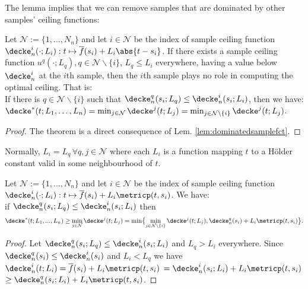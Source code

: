 The lemma implies that we can remove samples that are dominated by other samples' ceiling functions:
\begin{thm} 
\label{thm:removedominatedsamples}
Let $\mathcal N := \{1,...,N_n\}$ and let $i \in \mathcal N$ be the index of sample ceiling function $\decke_n^i(\cdot;L_i): t \mapsto \overline f(s_i) + L_i \abs{t - s_i}$. If there exists a sample ceiling function $u^q(\cdot;L_q), q \in \mathcal N \backslash \{i\}$, $L_q \leq L_i$ everywhere, having a value below $\decke_n^i$ at the $i$th sample, then the $i$th sample plays no role in computing the optimal ceiling. That is:\\  
If there is $q \in \mathcal N \backslash\{ i\}$ such that $\decke_n^q(s_i;L_q) \leq \decke_n^i(s_i;L_i)$, then we have: \\
$\decke^*(t;L_1,\ldots,L_n) = \min_{j \in \mathcal N} \decke^j(t;L_j) =  \min_{j \in \mathcal N\backslash \{i\}} \decke^j(t;L_j)$.
\begin{proof}
The theorem is a direct consequence of Lem. \ref{lem:dominatedsamplefct}. 
\end{proof}

\end{thm}

\begin{rem}
Normally, $L_i = L_q\, \forall q,j \in \mathcal N$ where each $L_i$ is a function mapping $t$ to a H\"older constant valid in some neighbourhood of $t$.
\end{rem}

\begin{thm}
\label{thm:dominatedsamples_greatLIPconst}
Let $\mathcal N := \{1,...,N_n\}$ and let $i \in \mathcal N$ be the index of sample ceiling function $\decke_n^i(\cdot;L_i): t \mapsto \overline f(s_i) + L_i \metricp(t,s_i) $. We have: \\if $\decke_n^q(s_i;L_q) \leq \decke_n^i(s_i;L_i)$ then 
\[  \decke^*(t;L_1,...,L_n) \geq \min_{j \in \mathcal N} \decke^j(t;L_j) =  \min \bigl\{ \min_{j \in \mathcal N\backslash \{i\}} \decke^j(t;L_j), \decke_n^q(s_i) + L_i \metricp(t,s_i) \bigr\}.\]

\begin{proof} Let $\decke_n^q(s_i;L_q) \leq \decke_n^i(s_i;L_i)$ and $L_q > L_i $ everywhere. Since $\decke_n^q(s_i) \leq \decke_n^i(s_i)$ and $L_i < L_q$ we have $\decke_n^i(t;L_i) = \overline f(s_i) + L_i \metricp(t,s_i) $
$= \decke_n^i(s_i;L_i) + L_i \metricp(t,s_i)$
$\geq \decke_n^q(s_i;L_i) + L_i \metricp(t,s_i)$.

\end{proof}

\end{thm}

